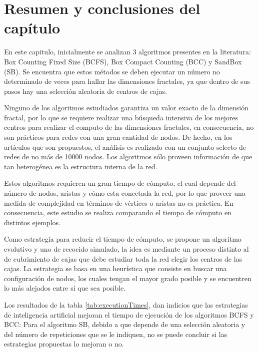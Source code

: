 \newpage
\section{Resumen y conclusiones del capítulo}

En este capitulo, inicialmente se analizan 3 algoritmos presentes en la literatura: Box Counting Fixed Size (BCFS), Box Compact Counting (BCC) y SandBox (SB). Se encuentra que estos métodos se deben ejecutar un número no determinado de veces para hallar las dimensiones fractales, ya que dentro de sus pasos hay una selección aleatoria de centros de cajas.

Ninguno de los algoritmos estudiados garantiza un valor exacto de la dimensión fractal, por lo que se requiere realizar una búsqueda intensiva de los mejores centros para realizar el computo de las dimensiones fractales, en consecuencia, no son prácticos para redes con una gran cantidad de nodos. De hecho, en los artículos que son propuestos, el análisis es realizado con un conjunto selecto de redes de no más de 10000 nodos. Los algoritmos sólo proveen información de que tan heterogénea es la estructura interna de la red.

Estos algoritmos requieren un gran tiempo de cómputo, el cual depende del número de nodos, aristas y cómo esta conectada la red, por lo que proveer una medida de complejidad en términos de vértices o aristas no es práctica. En consecuencia, este estudio se realiza comparando el tiempo de cómputo en distintos ejemplos.

Como estrategia para reducir el tiempo de cómputo, se propone un algoritmo evolutivo y uno de recocido simulado, la idea es mediante un proceso distinto al de cubrimiento de cajas que debe estudiar toda la red elegir los centros de las cajas. La estrategia se basa en una heurística que consiste en buscar una configuración de nodos, los cuales tengan el mayor grado posible y se encuentren lo más alejados entre sí que sea posible.

Los resultados de la tabla \ref{tab:executionTimes}, dan indicios que las estrategias de inteligencia artificial mejoran el tiempo de ejecución de los algoritmos BCFS y BCC: Para el algoritmo SB, debido a que depende de una selección aleatoria y del número de repeticiones que se le indiquen, no se puede concluir si las estrategias propuestas lo mejoran o no. 